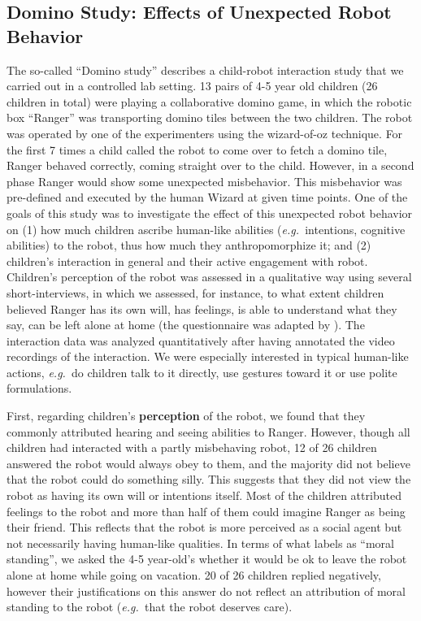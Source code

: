 \documentclass{frontiersSCNS} %
\newcommand{\eg}{{\textit{e.g.~}}}
\begin{document}
%
%
%
%
%
%


\subsection{Domino Study: Effects of Unexpected Robot Behavior}
\label{sec:domino-study}

The so-called ``Domino study'' describes a child-robot interaction study
that we carried out in a controlled lab setting. 13 pairs of 4-5 year old children (26 children in total) were playing a collaborative domino game, in which the robotic box ``Ranger'' \citep{fink_which_2014} was transporting domino tiles between the two children. 
The robot
was operated by one of the experimenters using the wizard-of-oz technique. For the first 7 times a child called the robot to come over to fetch a domino tile, Ranger behaved correctly, coming straight over to the child. However, in a second phase Ranger would show some unexpected misbehavior. This misbehavior was pre-defined and executed by the human Wizard at given time points. 
One of the goals of this
study was to investigate the effect of this unexpected robot behavior on (1) how much children ascribe
human-like abilities (\eg intentions, cognitive abilities) to the robot, thus how much they anthropomorphize it; and (2) children's interaction in general and their active engagement with robot. Children's perception 
of the robot was assessed in a qualitative way using several short-interviews, in which we assessed, for instance, to what extent children believed Ranger has its own will, has feelings, is able to understand what they say, can be left alone at home (the questionnaire was adapted by \citep{kahn_jr._robotic_2006}). The interaction data was analyzed quantitatively after having annotated the video recordings of the interaction. We were especially interested in typical human-like actions, \eg do children talk to it directly, use gestures 
toward it or use polite formulations.

First, regarding children's \textbf{perception} of the robot, we found that they commonly attributed hearing and seeing abilities to Ranger. However, though all children had interacted with a partly misbehaving robot, 12 of 26 children answered the robot would always obey to them, and the majority did not believe that the robot could do something silly. This suggests that they did not view the robot as having its own will or intentions itself. Most of the children attributed feelings to the robot and more than half of them could imagine Ranger as being their friend. This reflects that the robot is more perceived as a social agent but not necessarily having human-like qualities. In terms of what \citep{kahn_jr._robotic_2006} labels as ``moral standing'', we asked the 4-5 year-old's whether it would be ok to leave the robot alone at home while going on vacation. 20 of 26 children replied negatively, however their justifications on this answer do not reflect an attribution of moral standing to the robot (\eg that the robot deserves care).
\end{document}
